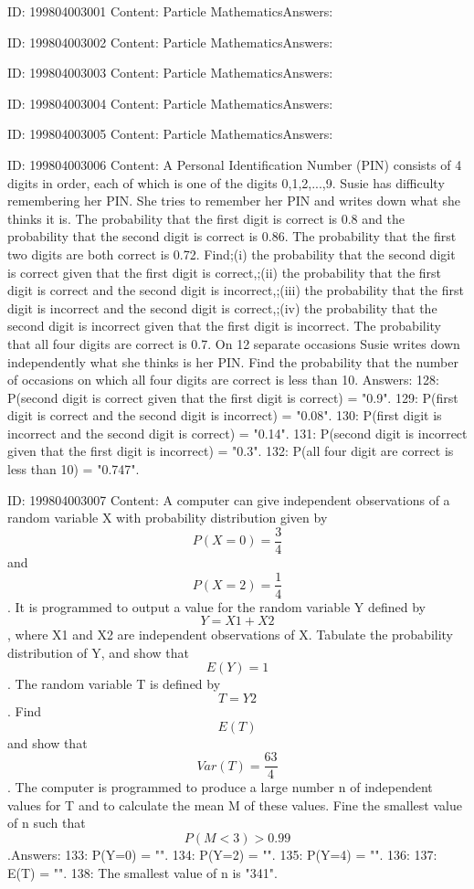\documentclass{article}
\begin{document}
ID: 199804003001
Content:
Particle MathematicsAnswers:

ID: 199804003002
Content:
Particle MathematicsAnswers:

ID: 199804003003
Content:
Particle MathematicsAnswers:

ID: 199804003004
Content:
Particle MathematicsAnswers:

ID: 199804003005
Content:
Particle MathematicsAnswers:

ID: 199804003006
Content:
A Personal Identification Number (PIN) consists of 4 digits in order, each of which is one of the digits 0,1,2,...,9. Susie has difficulty remembering her PIN. She tries to remember her PIN and writes down what she thinks it is. The probability that the first digit is correct is 0.8 and the probability that the second digit is correct is 0.86. The probability that the first two digits are both correct is 0.72. Find;(i) the probability that the second digit is correct given that the first digit is correct,;(ii) the probability that the first digit is correct and the second digit is incorrect,;(iii) the probability that the first digit is incorrect and the second digit is correct,;(iv) the probability that the second digit is incorrect given that the first digit is incorrect. The probability that all four digits are correct is 0.7. On 12 separate occasions Susie writes down independently what she thinks is her PIN. Find the probability that the number of occasions on which all four digits are correct is less than 10.  Answers:
128: P(second digit is correct given that the first digit is correct) = "0.9".
129: P(first digit is correct and the second digit is incorrect) = "0.08".
130: P(first digit is incorrect and the second digit is correct) = "0.14".
131: P(second digit is incorrect given that the first digit is incorrect) = "0.3".
132: P(all four digit are correct is less than 10) = "0.747".

ID: 199804003007
Content:
A computer can give independent observations of a random variable X with probability distribution given by $$P(X=0) = \frac{3}{4}$$ and $$P(X=2) = \frac{1}{4}$$. It is programmed to output a value for the random variable Y defined by $$Y = X1+X2$$, where X1 and X2 are independent observations of X. Tabulate the probability distribution of Y, and show that $$E(Y) = 1$$.  The random variable T is defined by $$T = Y2$$. Find $$E(T)$$ and show that $$Var(T) = \frac{63}{4}$$.  The computer is programmed to produce a large number n of independent values for T and to calculate the mean M of these values. Fine the smallest value of n such that $$P(M < 3) > 0.99$$.Answers:
133: P(Y=0) = "".
134: P(Y=2) = "".
135: P(Y=4) = "".
136: 
137: E(T) = "".
138: The smallest value of n is "341".
\end{document}
